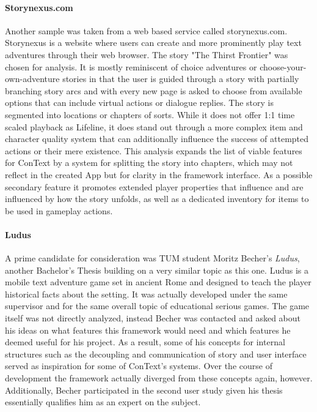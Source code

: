 \paragraph{Storynexus.com} %
Another sample was taken from a web based service called storynexus.com. Storynexus is a website where users can create and more prominently play text adventures through their web browser. The story "The Thirst Frontier" was chosen for analysis. It is mostly reminiscent of choice adventures or choose-your-own-adventure stories in that the user is guided through a story with partially branching story arcs and with every new page is asked to choose from available options that can include virtual actions or dialogue replies. The story is segmented into locations or chapters of sorts. While it does not offer 1:1 time scaled playback as Lifeline, it does stand out through a more complex item and character quality system that can additionally influence the success of attempted actions or their mere existence. 
This analysis expands the list of viable features for ConText by a system for splitting the story into chapters, which may not reflect in the created App but for clarity in the framework interface. As a possible secondary feature it promotes extended player properties that influence and are influenced by how the story unfolds, as well as a dedicated inventory for items to be used in gameplay actions. 
\paragraph{Ludus} %
A prime candidate for consideration was TUM student Moritz Becher's \textit{Ludus}, another Bachelor's Thesis building on a very similar topic as this one. Ludus is a mobile text adventure game set in ancient Rome and designed to teach the player historical facts about the setting. It was actually developed under the same supervisor and for the same overall topic of educational serious games. The game itself was not directly analyzed, instead Becher was contacted and asked about his ideas on what features this framework would need and which features he deemed useful for his project. As a result, some of his concepts for internal structures such as the decoupling and communication of story and user interface served as inspiration for some of ConText's systems. Over the course of development the framework actually diverged from these concepts again, however. Additionally, Becher participated in the second user study given his thesis essentially qualifies him as an expert on the subject. 

